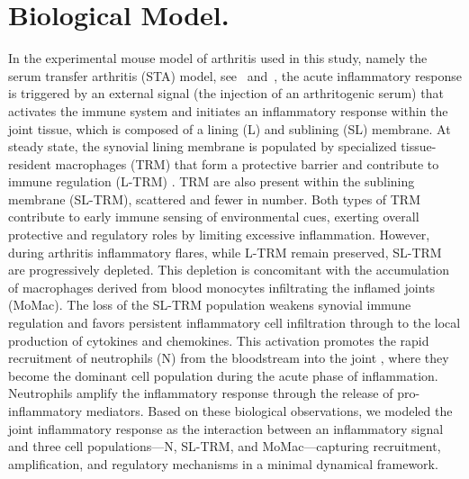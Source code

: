 \documentclass[a4paper, 12pt]{article}
\providecommand{\DIFaddtex}[1]{{\protect\color{blue} \sf #1}} %
\providecommand{\DIFaddbegin}{} %
\providecommand{\DIFaddend}{} %
\providecommand{\DIFadd}[1]{\texorpdfstring{\DIFaddtex{#1}}{#1}} %
\begin{document}
\section{Biological Model.}\label{sec:model}
In the experimental mouse model of arthritis used in this study, namely the serum transfer arthritis (STA) model, see~\cite{STA} and~\cite{weihaupt26},
 the acute inflammatory response is triggered by an external signal (the injection of an arthritogenic serum) 
 that activates the immune system and initiates an inflammatory response 
 within the joint tissue, which is composed of a lining (L) and sublining (SL) membrane.
  At steady state, the synovial lining membrane is populated by specialized tissue-resident macrophages (TRM) 
  that form a protective barrier and contribute to immune regulation (L-TRM) \DIFaddbegin \DIFadd{\cite{culemann2019}}\DIFaddend . TRM are also present within the sublining membrane (SL-TRM),
   scattered and fewer in number. 
  Both types of TRM contribute to early immune sensing of environmental cues, exerting overall protective and regulatory roles by limiting excessive inflammation.
   However, during arthritis inflammatory flares, while L-TRM remain preserved, SL-TRM are progressively depleted. 
   This depletion is concomitant with the accumulation of macrophages derived from blood monocytes infiltrating the inflamed joints (MoMac). 
   The loss of the SL-TRM population weakens synovial immune regulation and favors persistent inflammatory cell infiltration through 
   to the local production of cytokines and chemokines. This activation promotes the rapid recruitment of neutrophils (N) from the bloodstream into the joint \DIFaddbegin \DIFadd{\cite{culemann2019}}\DIFaddend , 
   where they become the dominant cell population during the acute phase of inflammation.
    Neutrophils amplify the inflammatory response through the release of pro-inflammatory mediators. 
     Based on these biological observations, we modeled the joint inflammatory response as the interaction between an inflammatory signal and three cell populations—N, SL-TRM, and MoMac—capturing recruitment,
      amplification, and regulatory mechanisms in a minimal dynamical framework.
\end{document}
